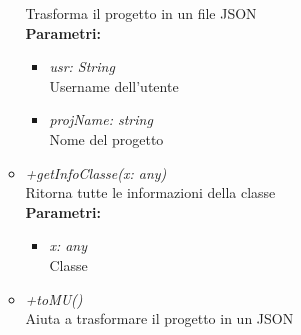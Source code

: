 \begin{itemize}
\begin{itemize}
    		Trasforma il progetto in un file JSON\\
    		\textbf{Parametri:}
    		\begin{itemize}
    			\item \emph{usr: String}\\
    			Username dell'utente
    			\item \emph{projName: string}\\
    			Nome del progetto
    		\end{itemize}
    		\item \emph{+getInfoClasse(x: any)}\\
    		Ritorna tutte le informazioni della classe\\
    		\textbf{Parametri:}
    		\begin{itemize}
    			\item \emph{x: any}\\
    			Classe
    		\end{itemize}
    		\item \emph{+toMU()}\\
    		Aiuta a trasformare il progetto in un JSON
		\end{itemize}
\end{itemize}